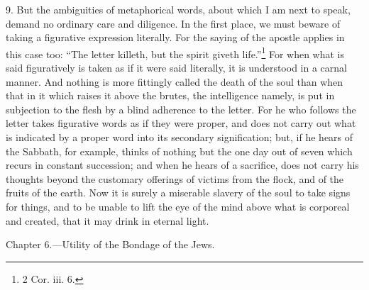 9. But the ambiguities of metaphorical words, about which I am next to speak, demand no ordinary care and diligence. In the first place, we must beware of taking a figurative expression literally. For the saying of the apostle applies in this case too: “The letter killeth, but the spirit giveth life.”\footnote{2 Cor. iii. 6.} For when what is said figuratively is taken as if it were said literally, it is understood in a carnal manner. And nothing is more fittingly called the death of the soul than when that in it which raises it above the brutes, the intelligence namely, is put in subjection to the flesh by a blind adherence to the letter. For he who follows the letter takes figurative words as if they were proper, and does not carry out what is indicated by a proper word into its secondary signification; but, if he hears of the Sabbath, for example, thinks of nothing but the one day out of seven which recurs in constant succession; and when he hears of a sacrifice, does not carry his thoughts beyond the customary offerings of victims from the flock, and of the fruits of the earth. Now it is surely a miserable slavery of the soul to take signs for things, and to be unable to lift the eye of the mind above what is corporeal and created, that it may drink in eternal light.


Chapter 6.—Utility of the Bondage of the Jews.

